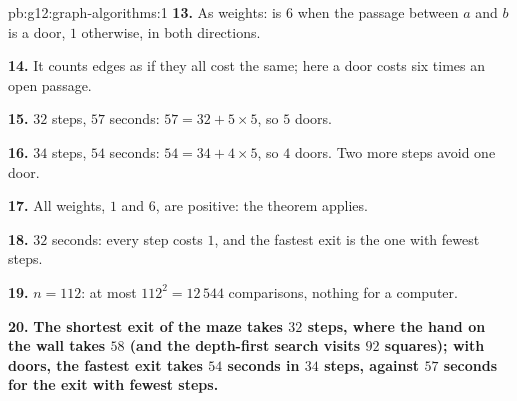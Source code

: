 \begin{solution}{pb:g12:graph-algorithms:1}
\textbf{13.} As weights:  is $6$ when the passage between $a$ and $b$ is a door, $1$ otherwise, in both
directions.

\textbf{14.} It counts edges as if they all cost the same; here a door costs six times an open passage.

\textbf{15.} $32$ steps, $57$ seconds: $57 = 32 + 5 \times 5$, so $5$ doors.

\textbf{16.} $34$ steps, $54$ seconds: $54 = 34 + 4 \times 5$, so $4$ doors. Two more steps avoid one door.

\textbf{17.} All weights, $1$ and $6$, are positive: the theorem applies.

\textbf{18.} $32$ seconds: every step costs $1$, and the fastest exit is the one with fewest steps.

\textbf{19.} $n = 112$: at most $112^2 = 12\,544$ comparisons, nothing for a computer.

\textbf{20.} \textbf{The shortest exit of the maze takes $32$ steps, where the hand on the wall takes $58$ (and the
depth-first search visits $92$ squares); with doors, the fastest exit takes $54$ seconds in $34$ steps, against $57$
seconds for the exit with fewest steps.}
\end{solution}

